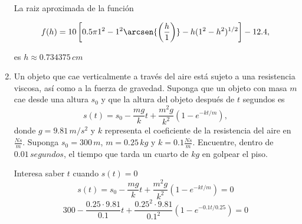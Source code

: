 \documentclass[12pt]{article}
\begin{document}
\begin{enumerate}
    La raiz aproximada de la función
    
    \[ f(h) = 10 \left[ 0.5\pi 1^{2} - 1^{2}\arcsen{\left( \frac{h}{1} \right)} - h(1^{2} - h^{2})^{1/2} \right] - 12.4 ,\]
    
    es \(h \approx 0.734375 \, cm\)

    \item Un objeto que cae verticalmente a través del aire está sujeto a una resistencia viscosa, así como a la fuerza
    de gravedad. Suponga que un objeto con masa \(m\) cae desde una altura \(s_0\) y que la altura del objeto después
    de \(t\) segundos es
    \[s(t) = s_0 - \frac{mg}{k}t + \frac{m^{2}g}{k^{2}} \left( 1- e^{-kt/m}\right),\]
    donde \(g = 9.81\, m/s^{2}\) y \(k\) representa el coeficiente de la resistencia del aire en \(\frac{Ns}{m}\). Suponga \(s_0 = 300\, m\),
    \(m = 0.25\, kg\) y \(k = 0.1 \frac{Ns}{m}\). Encuentre, dentro de \(0.01\, segundos\), el tiempo que tarda un cuarto de \(kg\) en golpear el piso. 
    
    Interesa saber \(t\) cuando \(s(t) = 0\)
    \[s(t) = s_0 - \frac{mg}{k}t + \frac{m^{2}g}{k^{2}} \left( 1- e^{-kt/m}\right) = 0\]
    \[300 - \frac{0.25 \cdot 9.81}{0.1}t + \frac{0.25^{2} \cdot 9.81}{0.1^{2}} \left( 1 - e^{-0.1t/0.25}\right) = 0\]


\end{enumerate}
\end{document}
